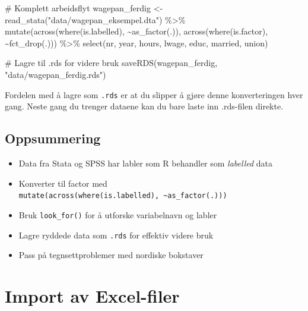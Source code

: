 \documentclass[
  norsk,
  letterpaper,
  DIV=11,
  numbers=noendperiod]{scrreprt}
\newenvironment{Shaded}{\begin{snugshade}}{\end{snugshade}}
\newcommand{\CommentTok}[1]{\textcolor[rgb]{0.37,0.37,0.37}{#1}}
\newcommand{\FunctionTok}[1]{\textcolor[rgb]{0.28,0.35,0.67}{#1}}
\newcommand{\NormalTok}[1]{\textcolor[rgb]{0.00,0.23,0.31}{#1}}
\newcommand{\OtherTok}[1]{\textcolor[rgb]{0.00,0.23,0.31}{#1}}
\newcommand{\SpecialCharTok}[1]{\textcolor[rgb]{0.37,0.37,0.37}{#1}}
\newcommand{\StringTok}[1]{\textcolor[rgb]{0.13,0.47,0.30}{#1}}
\providecommand{\tightlist}{%
  \setlength{\itemsep}{0pt}\setlength{\parskip}{0pt}}
\theoremstyle{definition}
\theoremstyle{remark}
\begin{document}
\begin{Shaded}
\begin{Highlighting}[]
\CommentTok{\# Komplett arbeidsflyt}
\NormalTok{wagepan\_ferdig }\OtherTok{\textless{}{-}} \FunctionTok{read\_stata}\NormalTok{(}\StringTok{"data/wagepan\_eksempel.dta"}\NormalTok{) }\SpecialCharTok{\%\textgreater{}\%}
  \FunctionTok{mutate}\NormalTok{(}\FunctionTok{across}\NormalTok{(}\FunctionTok{where}\NormalTok{(is.labelled), }\SpecialCharTok{\textasciitilde{}}\FunctionTok{as\_factor}\NormalTok{(.)),}
         \FunctionTok{across}\NormalTok{(}\FunctionTok{where}\NormalTok{(is.factor), }\SpecialCharTok{\textasciitilde{}}\FunctionTok{fct\_drop}\NormalTok{(.))) }\SpecialCharTok{\%\textgreater{}\%}
  \FunctionTok{select}\NormalTok{(nr, year, hours, lwage, educ, married, union)}

\CommentTok{\# Lagre til .rds for videre bruk}
\FunctionTok{saveRDS}\NormalTok{(wagepan\_ferdig, }\StringTok{"data/wagepan\_ferdig.rds"}\NormalTok{)}
\end{Highlighting}
\end{Shaded}

Fordelen med å lagre som \texttt{.rds} er at du slipper å gjøre denne
konverteringen hver gang. Neste gang du trenger dataene kan du bare
laste inn .rds-filen direkte.

\section{Oppsummering}\label{oppsummering-7}

\begin{itemize}
\tightlist
\item
  Data fra Stata og SPSS har labler som R behandler som \emph{labelled}
  data
\item
  Konverter til factor med
  \texttt{mutate(across(where(is.labelled),\ \textasciitilde{}as\_factor(.)))}
\item
  Bruk \texttt{look\_for()} for å utforske variabelnavn og labler
\item
  Lagre ryddede data som \texttt{.rds} for effektiv videre bruk
\item
  Pass på tegnsettproblemer med nordiske bokstaver
\end{itemize}

\chapter{Import av Excel-filer}\label{import-av-excel-filer}
\end{document}
